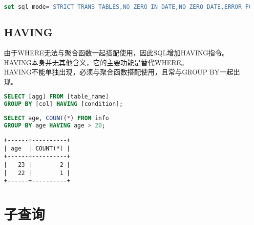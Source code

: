 \documentclass[12pt, openany, oneside]{book}
\begin{document}
\vspace{-0.5cm}

\begin{lstlisting}[language=SQL, breaklines=true, breakatwhitespace=false]
set sql_mode='STRICT_TRANS_TABLES,NO_ZERO_IN_DATE,NO_ZERO_DATE,ERROR_FOR_DIVISION_BY_ZERO,NO_ENGINE_SUBSTITUTION';
\end{lstlisting}

\vspace{0.5cm}

\section{HAVING}

由于WHERE无法与聚合函数一起搭配使用，因此SQL增加HAVING指令。HAVING本身并无其他含义，它的主要功能是替代WHERE。\\

HAVING不能单独出现，必须与聚合函数搭配使用，且常与GROUP BY一起出现。

\vspace{-0.5cm}

\begin{lstlisting}[language=SQL]
SELECT [agg] FROM [table_name]
GROUP BY [col] HAVING [condition];
\end{lstlisting}

\vspace{0.5cm}


\begin{lstlisting}[language=SQL]
SELECT age, COUNT(*) FROM info
GROUP BY age HAVING age > 20;
\end{lstlisting}

\begin{tcolorbox}
	\begin{verbatim}
+------+----------+
| age  | COUNT(*) |
+------+----------+
|   23 |        2 |
|   22 |        1 |
+------+----------+
	\end{verbatim}
\end{tcolorbox}

\newpage

\chapter{子查询}

\vspace{0.5cm}

\end{document}
